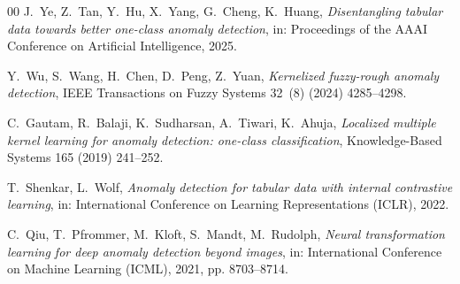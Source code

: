 \documentclass[times, review, 10pt]{elsarticle}
\begin{document}
\begin{thebibliography}{00}
J.~Ye, Z.~Tan, Y.~Hu, X.~Yang, G.~Cheng, K.~Huang,
\textit{Disentangling tabular data towards better one-class anomaly detection},
in: Proceedings of the AAAI Conference on Artificial Intelligence, 2025.

Y.~Wu, S.~Wang, H.~Chen, D.~Peng, Z.~Yuan,
\textit{Kernelized fuzzy-rough anomaly detection},
IEEE Transactions on Fuzzy Systems 32~(8) (2024) 4285--4298.

C.~Gautam, R.~Balaji, K.~Sudharsan, A.~Tiwari, K.~Ahuja,
\textit{Localized multiple kernel learning for anomaly detection: one-class
classification},
Knowledge-Based Systems 165 (2019) 241--252.

T.~Shenkar, L.~Wolf,
\textit{Anomaly detection for tabular data with internal contrastive learning},
in: International Conference on Learning Representations (ICLR), 2022.

C.~Qiu, T.~Pfrommer, M.~Kloft, S.~Mandt, M.~Rudolph,
\textit{Neural transformation learning for deep anomaly detection beyond images},
in: International Conference on Machine Learning (ICML), 2021, pp. 8703--8714.

\end{thebibliography}
\end{document}
